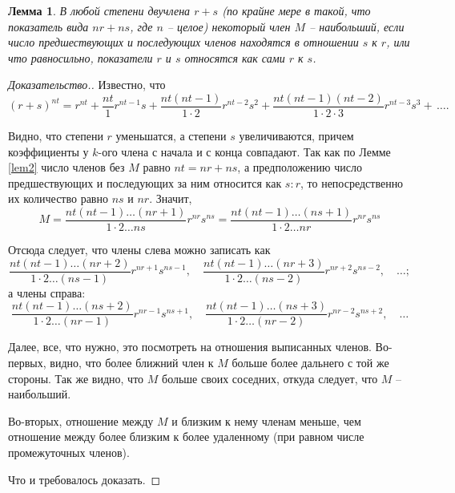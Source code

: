 \documentclass[12pt]{extarticle}
\newtheorem{lemma}{Лемма}
\begin{document}
\begin{lemma} \label{lem3}
В любой степени двучлена $r+s$ (по крайне мере в такой, что показатель вида $nr+ns$, где $n$ -- целое) некоторый член $M$ -- наибольший, если число предшествующих и последующих членов находятся в отношении $s$ к $r$, или что равносильно, показатели $r$ и $s$ относятся как сами $r$ к $s$.
\end{lemma}
\begin{proof}[Доказательство.]
 Известно, что $$(r+s)^{nt} = r^{nt}+\frac{nt}{1} r^{nt-1}s + \frac{nt (nt-1)}{1 \cdot 2}r^{nt-2}s^2 + \frac{nt (nt-1) (nt-2)}{1 \cdot 2 \cdot 3} r^{nt-3} s^3 + \,\dots.$$

Видно, что степени $r$ уменьшатся, а степени $s$ увеличиваются, причем коэффициенты у $k$-ого члена с начала и с конца совпадают.
Так как по Лемме \ref{lem2} число членов без $M$ равно $nt=nr+ns$, а предположению число предшествующих и последующих за ним относится как $s : r$, то непосредственно их количество равно $ns$ и $nr$.
Значит, $$M = \frac{nt (nt-1) \dots (nr+1)}{1 \cdot 2 \dots ns} r^{nr} s^{ns} = 
\frac{nt (nt-1) \dots (ns+1)}{1 \cdot 2 \dots nr} r^{nr} s^{ns} $$

Отсюда следует, что члены слева можно записать как
$$\frac{nt (nt-1) \dots (nr+2)}{1 \cdot 2 \dots (ns-1)} r^{nr+1} s^{ns-1}, \quad \frac{nt (nt-1) \dots (nr+3)}{1 \cdot 2 \dots (ns-2)} r^{nr+2} s^{ns-2}, \quad \dots ;$$
а члены справа:
$$\frac{nt (nt-1) \dots (ns+2)}{1 \cdot 2 \dots (nr-1)} r^{nr-1} s^{ns+1}, \quad \frac{nt (nt-1) \dots (ns+3)}{1 \cdot 2 \dots (nr-2)} r^{nr-2} s^{ns+2}, \quad \dots $$

Далее, все, что нужно, это посмотреть на отношения выписанных членов.
Во-первых, видно, что более ближний член к $M$ больше более дальнего с той же стороны.
Так же видно, что $M$ больше своих соседних, откуда следует, что $M$ -- наибольший.

Во-вторых, отношение между $M$ и близким к нему членам меньше, чем отношение между более близким к более удаленному (при равном числе промежуточных членов).

Что и требовалось доказать.
\end{proof}
\end{document}
